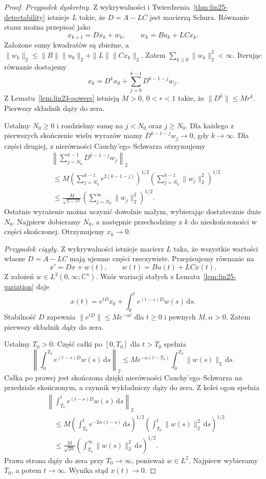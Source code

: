 \begin{proof}
\emph{Przypadek dyskretny.}
Z wykrywalności i
Twierdzenia~\ref{thm:lin25-detectability}
istnieje \(L\)
takie, że
\(D=A-LC\) jest
macierzą Schura.
Równanie stanu można
przepisać jako
\[
 x_{k+1}=Dx_k+w_k,
 \qquad
 w_k=Bu_k+LCx_k.
\]
Założone sumy kwadratów
są zbieżne, a
\(\|w_k\|_2\le
 \|B\|\|u_k\|_2+
 \|L\|\|Cx_k\|_2\).
Zatem
\(\sum_{k\ge0}\|w_k\|_2^2<\infty\).
Iterując równanie dostajemy
\[
 x_k=D^kx_0+
      \sum_{j=0}^{k-1}
         D^{k-1-j}w_j.
\]
Z
Lematu~\ref{lem:lin23-powers}
istnieją \(M>0\), \(0<r<1\)
takie, że
\(\|D^k\|\le Mr^k\).
Pierwszy składnik
dąży do zera.

Ustalmy \(N_0\ge0\)
i rozdzielmy sumę
na \(j<N_0\)
oraz \(j\ge N_0\).
Dla każdego
z pierwszych skończenie
wielu wyrazów mamy
\(D^{k-1-j}w_j\to0\),
gdy \(k\to\infty\).
Dla części drugiej,
z nierówności
Cauchy'ego--Schwarza
otrzymujemy
\[
 \begin{aligned}
 &\left\|
 \sum_{j=N_0}^{k-1}
      D^{k-1-j}w_j\right\|_2\\
 &\ \le
 M\left(\sum_{j=N_0}^{k-1}
      r^{2(k-1-j)}\right)^{1/2}
  \left(\sum_{j=N_0}^{k-1}
      \|w_j\|_2^2\right)^{1/2}\\
 &\ \le
 \frac{M}{\sqrt{1-r^2}}
 \left(\sum_{j=N_0}^{\infty}
       \|w_j\|_2^2\right)^{1/2}.
 \end{aligned}
\]
Ostatnie wyrażenie
można uczynić dowolnie
małym, wybierając
dostatecznie duże \(N_0\).
Najpierw dobieramy
\(N_0\), a następnie
przechodzimy z \(k\)
do nieskończoności
w części skończonej.
Otrzymujemy \(x_k\to0\).

\emph{Przypadek ciągły.}
Z wykrywalności istnieje
macierz \(L\)
taka, że wszystkie
wartości własne
\(D=A-LC\)
mają ujemne części rzeczywiste.
Przepisujemy równanie na
\[
 x'=Dx+w(t),\qquad
 w(t)=Bu(t)+LCx(t).
\]
Z założeń
\(w\in L^2(0,\infty;\mathbb C^n)\).
Wzór wariacji stałych
z
Lematu~\ref{lem:lin25-variation}
daje
\[
 x(t)=e^{tD}x_0+
       \int_0^t e^{(t-s)D}w(s)\,\mathrm ds.
\]
Stabilność \(D\) zapewnia
\(\|e^{tD}\|\le Me^{-\alpha t}\)
dla \(t\ge0\)
i pewnych \(M,\alpha>0\).
Zatem pierwszy składnik
dąży do zera.

Ustalmy \(T_0>0\).
Część całki po
\([0,T_0]\) dla \(t>T_0\)
spełnia
\[
 \left\|\int_0^{T_0}
 e^{(t-s)D}w(s)\,\mathrm ds\right\|_2
 \le Me^{-\alpha(t-T_0)}
      \int_0^{T_0}\|w(s)\|_2\,\mathrm ds.
\]
Całka po prawej
jest skończona dzięki
nierówności Cauchy'ego--Schwarza
na przedziale skończonym,
a czynnik wykładniczy
dąży do zera.
Z kolei ogon spełnia
\[
 \begin{aligned}
 &\left\|\int_{T_0}^{t}
    e^{(t-s)D}w(s)\,\mathrm ds\right\|_2\\
 &\quad\le
 M\left(\int_{T_0}^{t}
          e^{-2\alpha(t-s)}
       \,\mathrm ds\right)^{1/2}
  \left(\int_{T_0}^{t}
          \|w(s)\|_2^2\,\mathrm ds
       \right)^{1/2}\\
 &\quad\le
 \frac{M}{\sqrt{2\alpha}}
 \left(\int_{T_0}^{\infty}
       \|w(s)\|_2^2\,\mathrm ds\right)^{1/2}.
 \end{aligned}
\]
Prawa strona dąży do zera
przy \(T_0\to\infty\),
ponieważ \(w\in L^2\).
Najpierw wybieramy \(T_0\),
a potem \(t\to\infty\).
Wynika stąd \(x(t)\to0\).
\end{proof}


